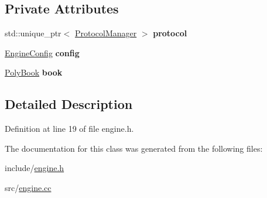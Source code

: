 \subsection*{Private Attributes}
\begin{DoxyCompactItemize}
\item 
\mbox{\label{classEngine_a20ac20c3580244eced45e2f2f767a8da}} 
std\+::unique\+\_\+ptr$<$ \mbox{\hyperlink{classProtocolManager}{Protocol\+Manager}} $>$ {\bfseries protocol}
\item 
\mbox{\label{classEngine_a63db1301ca47ea013b3fa83fd541a9aa}} 
\mbox{\hyperlink{structEngineConfig}{Engine\+Config}} {\bfseries config}
\item 
\mbox{\label{classEngine_aa30f12ae58d51f051f22499f95c2602e}} 
\mbox{\hyperlink{classPolyBook}{Poly\+Book}} {\bfseries book}
\end{DoxyCompactItemize}


\subsection{Detailed Description}


Definition at line 19 of file engine.\+h.



The documentation for this class was generated from the following files\+:\begin{DoxyCompactItemize}
\item 
include/\mbox{\hyperlink{engine_8h}{engine.\+h}}\item 
src/\mbox{\hyperlink{engine_8cc}{engine.\+cc}}\end{DoxyCompactItemize}
